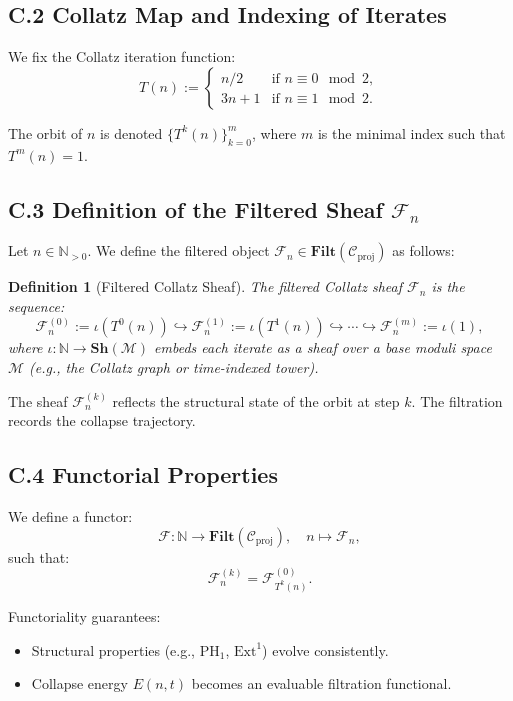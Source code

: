 \documentclass[11pt]{article}
\newtheorem{definition}[theorem]{Definition}
\begin{document}
\subsection*{C.2 Collatz Map and Indexing of Iterates}

We fix the Collatz iteration function:
\[
T(n) := 
\begin{cases}
n/2 & \text{if } n \equiv 0 \mod 2, \\
3n + 1 & \text{if } n \equiv 1 \mod 2.
\end{cases}
\]

The orbit of \( n \) is denoted \( \{T^k(n)\}_{k=0}^m \), where \( m \) is the minimal index such that \( T^m(n) = 1 \).

\subsection*{C.3 Definition of the Filtered Sheaf \texorpdfstring{\( \mathcal{F}_n \)}{Fn}}

Let \( n \in \mathbb{N}_{>0} \). We define the filtered object \( \mathcal{F}_n \in \mathbf{Filt}(\mathcal{C}_{\mathrm{proj}}) \) as follows:

\begin{definition}[Filtered Collatz Sheaf]
The filtered Collatz sheaf \( \mathcal{F}_n \) is the sequence:
\[
\mathcal{F}_n^{(0)} := \iota(T^0(n)) \hookrightarrow \mathcal{F}_n^{(1)} := \iota(T^1(n)) \hookrightarrow \cdots \hookrightarrow \mathcal{F}_n^{(m)} := \iota(1),
\]
where \( \iota : \mathbb{N} \to \mathbf{Sh}(\mathcal{M}) \) embeds each iterate as a sheaf over a base moduli space \( \mathcal{M} \) (e.g., the Collatz graph or time-indexed tower).
\end{definition}

The sheaf \( \mathcal{F}_n^{(k)} \) reflects the structural state of the orbit at step \( k \). The filtration records the collapse trajectory.

\subsection*{C.4 Functorial Properties}

We define a functor:
\[
\mathcal{F} : \mathbb{N} \longrightarrow \mathbf{Filt}(\mathcal{C}_{\mathrm{proj}}), \quad n \mapsto \mathcal{F}_n,
\]
such that:
\[
\mathcal{F}_n^{(k)} = \mathcal{F}_{T^k(n)}^{(0)}.
\]

\noindent Functoriality guarantees:
\begin{itemize}
  \item Structural properties (e.g., \( \mathrm{PH}_1 \), \( \mathrm{Ext}^1 \)) evolve consistently.
  \item Collapse energy \( E(n, t) \) becomes an evaluable filtration functional.
\end{itemize}
\end{document}
